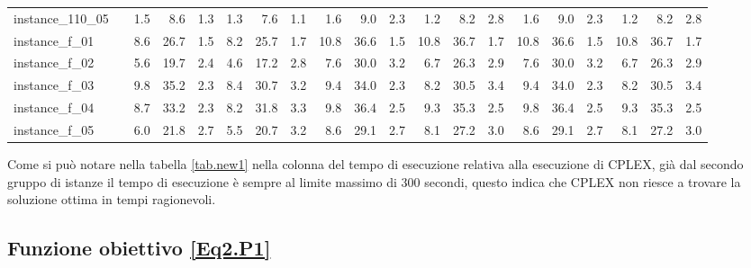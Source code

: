 \documentclass[12pt,a4paper,openright,twoside]{book}
\begin{document}
\begin{table}[H]
{\begin{tabular}{|ll|rrrrrr|rrrrrr|rrrrrr|}
instance\_110\_05             &     &   1.5  &   8.6   &  1.3  &   1.3  &   7.6   &  1.1  &   1.6  &   9.0   &  2.3  &   1.2  &   8.2   &  2.8  &   1.6  &   9.0   &  2.3  &   1.2  &   8.2   &  2.8  \\ 
instance\_f\_01               &     &   8.6  &   26.7  &  1.5  &   8.2  &   25.7  &  1.7  &   10.8 &   36.6  &  1.5  &   10.8  &  36.7  &  1.7  &   10.8 &   36.6  &  1.5  &   10.8  &  36.7  &  1.7 \\   
instance\_f\_02               &     &   5.6  &   19.7  &  2.4  &   4.6  &   17.2  &  2.8  &   7.6  &   30.0  &  3.2  &   6.7  &   26.3  &  2.9  &   7.6  &   30.0  &  3.2  &   6.7  &   26.3  &  2.9 \\   
instance\_f\_03               &     &   9.8  &   35.2  &  2.3  &   8.4  &   30.7  &  3.2  &   9.4  &   34.0  &  2.3  &   8.2  &   30.5  &  3.4  &   9.4  &   34.0  &  2.3  &   8.2  &   30.5  &  3.4 \\   
instance\_f\_04               &     &   8.7  &   33.2  &  2.3  &   8.2  &   31.8  &  3.3  &   9.8  &   36.4  &  2.5  &   9.3  &   35.3  &  2.5  &   9.8  &   36.4  &  2.5  &   9.3  &   35.3  &  2.5 \\   
instance\_f\_05               &     &   6.0  &   21.8  &  2.7  &   5.5  &   20.7  &  3.2  &   8.6  &   29.1  &  2.7  &   8.1  &   27.2  &  3.0  &   8.6  &   29.1  &  2.7  &   8.1  &   27.2  &  3.0 \\ 
 \hline
\end{tabular}
}
\end{table}

Come si può notare nella tabella \ref{tab.new1} nella colonna del tempo di esecuzione relativa alla esecuzione di CPLEX, già dal secondo gruppo di istanze  il tempo di esecuzione è sempre al limite massimo di 300 secondi, questo indica che CPLEX non riesce a trovare la soluzione ottima in tempi ragionevoli. 

\subsection{Funzione obiettivo \texorpdfstring{\eqref{Eq2.P1}}{(5.23)}}
\end{document}
